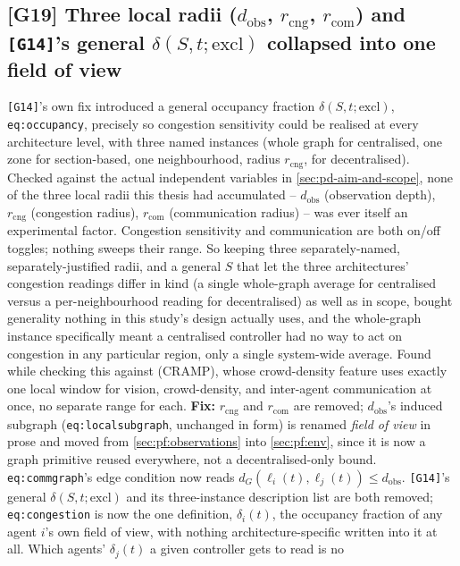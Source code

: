 \documentclass[11pt]{article}
\begin{document}
\subsection{[G19] Three local radii ($d_{\mathrm{obs}}$, $r_{\mathrm{cng}}$,
$r_{\mathrm{com}}$) and \texttt{[G14]}'s general $\delta(S,t;\mathrm{excl})$
collapsed into one field of view}
\texttt{[G14]}'s own fix introduced a general occupancy fraction
$\delta(S,t;\mathrm{excl})$, \texttt{eq:occupancy}, precisely so congestion
sensitivity could be realised at every architecture level, with three named
instances (whole graph for centralised, one zone for section-based, one
neighbourhood, radius $r_{\mathrm{cng}}$, for decentralised). Checked against
the actual independent variables in \ref{sec:pd-aim-and-scope}, none of the
three local radii this thesis had accumulated -- $d_{\mathrm{obs}}$
(observation depth), $r_{\mathrm{cng}}$ (congestion radius), $r_{\mathrm{com}}$
(communication radius) -- was ever itself an experimental factor. Congestion
sensitivity and communication are both on/off toggles; nothing sweeps their
range. So keeping three separately-named, separately-justified radii, and a
general $S$ that let the three architectures' congestion readings differ in
kind (a single whole-graph average for centralised versus a per-neighbourhood
reading for decentralised) as well as in scope, bought generality nothing in
this study's design actually uses, and the whole-graph instance specifically
meant a centralised controller had no way to act on congestion in any
particular region, only a single system-wide average. Found while checking
this against \citet{pham2024optimizingcrowdawaremultiagentpath} (CRAMP), whose
crowd-density feature uses exactly one local window for vision, crowd-density,
and inter-agent communication at once, no separate range for each.
\textbf{Fix:} $r_{\mathrm{cng}}$ and $r_{\mathrm{com}}$ are removed;
$d_{\mathrm{obs}}$'s induced subgraph (\texttt{eq:localsubgraph}, unchanged in
form) is renamed \emph{field of view} in prose and moved from
\ref{sec:pf:observations} into \ref{sec:pf:env}, since it is now a graph
primitive reused everywhere, not a decentralised-only bound.
\texttt{eq:commgraph}'s edge condition now reads $d_G(\ell_i(t),\ell_j(t)) \le
d_{\mathrm{obs}}$. \texttt{[G14]}'s general $\delta(S,t;\mathrm{excl})$ and its
three-instance description list are both removed; \texttt{eq:congestion} is
now the one definition, $\delta_i(t)$, the occupancy fraction of any agent
$i$'s own field of view, with nothing architecture-specific written into it
at all. Which agents' $\delta_j(t)$ a given controller gets to read is no
\end{document}
